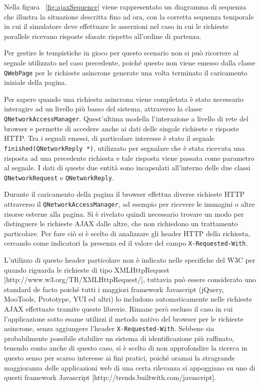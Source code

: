 \documentclass[12pt]{toptesi}
\begin{document}
Nella figura ~\ref{fig:ajaxSequence} viene rappresentato un diagramma di sequenza che illustra la situazione descritta fino ad ora, con la corretta sequenza temporale in cui il simulatore deve effettuare le asserzioni nel caso in cui le richieste parallele ricevano risposte sfasate rispetto all'ordine di partenza.  

Per gestire le tempistiche in gioco per questo scenario non si può ricorrere al segnale utilizzato nel caso precedente, poiché questo non viene emesso dalla classe \verb|QWebPage| per le richieste asincrone generate una volta terminato il caricamento iniziale della pagina.

Per sapere quando una richiesta asincrona viene completata è stato necessario interagire ad un livello più basso del sistema, attraverso la classe \verb|QNetworkAccessManager|. Quest'ultima modella l'interazione a livello di rete del browser e permette di accedere anche ai dati delle singole richieste e risposte HTTP. Tra i segnali emessi, di particolare interesse è stato il segnale \verb|finished(QNetworkReply *)|, utilizzato per segnalare che è stata ricevuta una risposta ad una precedente richiesta e tale risposta viene passata come parametro al segnale. I dati di queste due entità sono incapsulati all'interno delle due classi \verb|QNetworkRequest| e \verb|QNetworkReply|.

Durante il caricamento della pagina il browser effettua diverse richieste HTTP attraverso il \verb|QNetworkAccessManager|, ad esempio per ricevere le immagini o altre risorse esterne alla pagina. Si è rivelato quindi necessario trovare un modo per distinguere le richieste AJAX dalle altre, che non richiedono un trattamento particolare. Per fare ciò si è scelto di analizzare gli header HTTP della richiesta, cercando come indicatori la presenza ed il valore del campo \verb|X-Requested-With|.

L'utilizzo di questo header particolare non è indicato nelle specifiche del W3C per quando riguarda le richieste di tipo XMLHttpRequest [http://www.w3.org/TR/XMLHttpRequest/], tuttavia può essere considerato uno standard de facto poiché tutti i maggiori framework Javascript (jQuery, MooTools, Prototype, YUI ed altri) lo includono automaticamente nelle richieste AJAX effettuate tramite queste librerie. Rimane però escluso il caso in cui l'applicazione sotto esame utilizzi il metodo nativo del browser per le richieste asincrone, senza aggiungere l'header \verb|X-Requested-With|. Sebbene sia probabilmente possibile stabilire un sistema di identificazione più raffinato, tenendo conto anche di questo caso, si è scelto di non approfondire la ricerca in questo senso per scarso interesse ai fini pratici, poiché oramai la stragrande maggioranza delle applicazioni web di una certa rilevanza si appoggiano su uno di questi framework Javascript [http://trends.builtwith.com/javascript].
\end{document}
